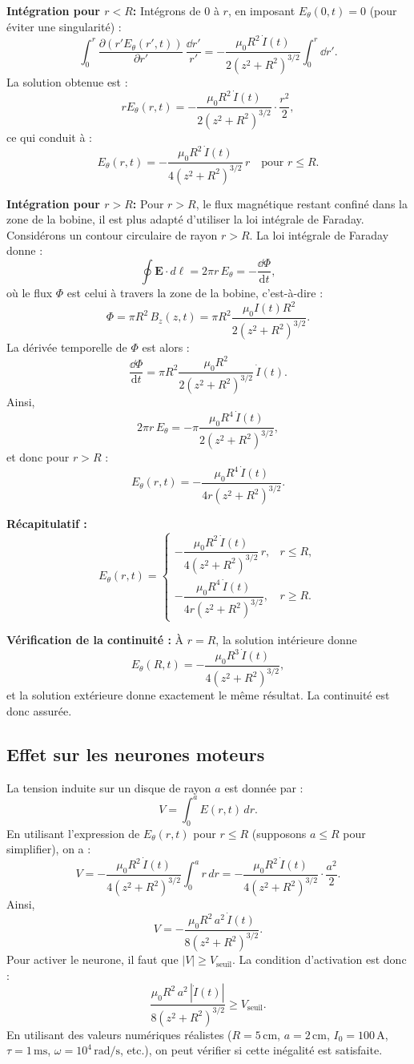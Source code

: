 \documentclass[a4paper,10pt]{report}
\begin{document}
	\textbf{Intégration pour $r < R$:}  
	Intégrons de $0$ à $r$, en imposant $E_\theta(0,t)=0$ (pour éviter une singularité) :
	\[
	\int_0^r \frac{\partial (r'E_\theta(r',t))}{\partial r'}\,\frac{\dd r'}{r'} = -\frac{\mu_0 R^2\,\dot{I}(t)}{2\left(z^2+R^2\right)^{3/2}} \int_0^r \dd r'.
	\]
	La solution obtenue est :
	\[
	rE_\theta(r,t) = -\frac{\mu_0 R^2\,\dot{I}(t)}{2\left(z^2+R^2\right)^{3/2}}\cdot\frac{r^2}{2},
	\]
	ce qui conduit à :
	\[
	E_\theta(r,t)= -\frac{\mu_0 R^2\,\dot{I}(t)}{4\left(z^2+R^2\right)^{3/2}}\,r \quad \text{pour } r\le R.
	\]
	
	\textbf{Intégration pour $r > R$:}  
	Pour $r>R$, le flux magnétique restant confiné dans la zone de la bobine, il est plus adapté d'utiliser la loi intégrale de Faraday. Considérons un contour circulaire de rayon $r>R$. La loi intégrale de Faraday donne :
	\[
	\oint \mathbf{E} \cdot d\boldsymbol{\ell} = 2\pi r\,E_\theta = -\frac{\dd \Phi}{\text{d}t},
	\]
	où le flux $\Phi$ est celui à travers la zone de la bobine, c'est-à-dire :
	\[
	\Phi = \pi R^2\,B_z(z,t)= \pi R^2 \frac{\mu_0 I(t) R^2}{2\left(z^2+R^2\right)^{3/2}}.
	\]
	La dérivée temporelle de $\Phi$ est alors :
	\[
	\frac{\dd \Phi}{\text{d}t} = \pi R^2 \frac{\mu_0 R^2}{2\left(z^2+R^2\right)^{3/2}}\,\dot{I}(t).
	\]
	Ainsi,
	\[
	2\pi r\,E_\theta = - \pi \frac{\mu_0 R^4\,\dot{I}(t)}{2\left(z^2+R^2\right)^{3/2}},
	\]
	et donc pour $r>R$ :
	\[
	E_\theta(r,t)= -\frac{\mu_0 R^4\,\dot{I}(t)}{4r\left(z^2+R^2\right)^{3/2}}.
	\]
	
	\textbf{Récapitulatif :}
	\[
	E_\theta(r,t)= 
	\begin{cases}
		-\dfrac{\mu_0 R^2\,\dot{I}(t)}{4\left(z^2+R^2\right)^{3/2}}\,r, & r\le R, \\[2mm]
		-\dfrac{\mu_0 R^4\,\dot{I}(t)}{4r\left(z^2+R^2\right)^{3/2}}, & r\ge R.
	\end{cases}
	\]
	
	\textbf{Vérification de la continuité :}  
	À $r=R$, la solution intérieure donne
	\[
	E_\theta(R,t)= -\frac{\mu_0 R^3\,\dot{I}(t)}{4\left(z^2+R^2\right)^{3/2}},
	\]
	et la solution extérieure donne exactement le même résultat. La continuité est donc assurée.
	
	\subsection{Effet sur les neurones moteurs}
	La tension induite sur un disque de rayon $a$ est donnée par :
	\[
	V = \int_0^a E(r,t)\,dr.
	\]
	En utilisant l'expression de $E_\theta(r,t)$ pour $r\le R$ (supposons $a\le R$ pour simplifier), on a :
	\[
	V = -\frac{\mu_0 R^2\,\dot{I}(t)}{4\left(z^2+R^2\right)^{3/2}} \int_0^a r\,dr
	= -\frac{\mu_0 R^2\,\dot{I}(t)}{4\left(z^2+R^2\right)^{3/2}} \cdot \frac{a^2}{2}.
	\]
	Ainsi,
	\[
	V = -\frac{\mu_0 R^2\,a^2\,\dot{I}(t)}{8\left(z^2+R^2\right)^{3/2}}.
	\]
	Pour activer le neurone, il faut que $|V| \ge V_{\text{seuil}}$. La condition d'activation est donc :
	\[
	\frac{\mu_0 R^2\,a^2\,|\dot{I}(t)|}{8\left(z^2+R^2\right)^{3/2}} \ge V_{\text{seuil}}.
	\]
	En utilisant des valeurs numériques réalistes ($R=5\,\text{cm}$, $a=2\,\text{cm}$, $I_0=100\,\text{A}$, $\tau=1\,\text{ms}$, $\omega=10^4\,\text{rad/s}$, etc.), on peut vérifier si cette inégalité est satisfaite.
	
\end{document}

